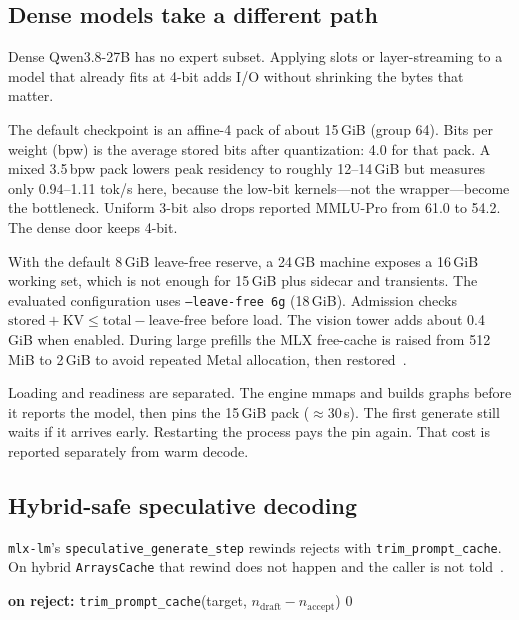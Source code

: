 \subsection{Dense models take a different path}
\label{sec:dense}

Dense Qwen3.8-27B has no expert subset. Applying slots or layer-streaming to a model that already fits at 4-bit adds I/O without shrinking the bytes that matter.

The default checkpoint is an affine-4 pack of about 15\,GiB (group 64). Bits per weight (bpw) is the average stored bits after quantization: 4.0 for that pack. A mixed 3.5\,bpw pack lowers peak residency to roughly 12--14\,GiB but measures only 0.94--1.11 tok/s here, because the low-bit kernels---not the wrapper---become the bottleneck. Uniform 3-bit also drops reported MMLU-Pro from 61.0 to 54.2. The dense door keeps 4-bit.

With the default 8\,GiB leave-free reserve, a 24\,GB machine exposes a 16\,GiB working set, which is not enough for 15\,GiB plus sidecar and transients. The evaluated configuration uses \texttt{--leave-free 6g} (18\,GiB). Admission checks $\mathrm{stored}+\mathrm{KV}\le \mathrm{total}-\mathrm{leave\text{-}free}$ before load. The vision tower adds about 0.4\,GiB when enabled. During large prefills the MLX free-cache is raised from 512\,MiB to 2\,GiB to avoid repeated Metal allocation, then restored~\citep{mlx3350}.

Loading and readiness are separated. The engine mmaps and builds graphs before it reports the model, then pins the 15\,GiB pack (${\approx}30$\,s). The first generate still waits if it arrives early. Restarting the process pays the pin again. That cost is reported separately from warm decode.

\subsection{Hybrid-safe speculative decoding}
\label{sec:spec}

\texttt{mlx-lm}’s \texttt{speculative\_generate\_step} rewinds rejects with \texttt{trim\_prompt\_cache}. On hybrid \texttt{ArraysCache} that rewind does not happen and the caller is not told~\citep{mlxlmcache,slotbankrepo}.

\begin{algorithm}[t]
\caption{Unsafe rewind on an untrimmable hybrid cache}
\begin{algorithmic}[1]
\State \textbf{on reject:} \texttt{trim\_prompt\_cache}(target, $n_{\mathrm{draft}}-n_{\mathrm{accept}}$)
  \State \Return $0$ 
\EndIf
\end{algorithmic}
\end{algorithm}


